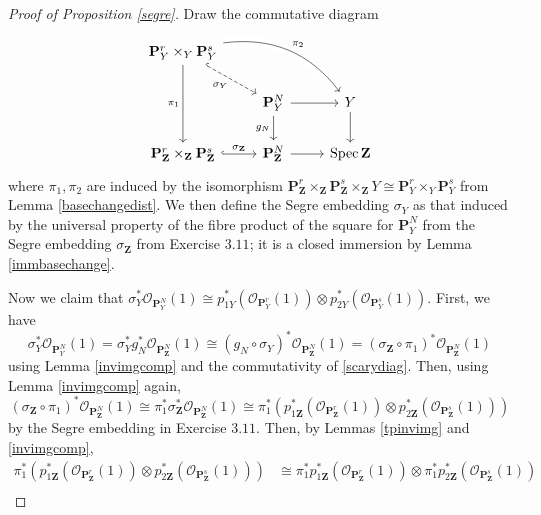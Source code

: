 \documentclass[10pt]{article}
\theoremstyle{definition}
\theoremstyle{remark}
\numberwithin{equation}{section}
\numberwithin{figure}{subsubsection}
\DeclareMathOperator{\Spec}{Spec}
\newcommand{\OO}{\mathcal{O}}
\begin{document}
\begin{proof}[Proof of Proposition \ref{segre}]
  Draw the commutative diagram
  \begin{equation}\label{scarydiag}
    \begin{tikzcd}
      \mathbf{P}_Y^r \times_Y \mathbf{P}_Y^s\arrow{dd}[swap]{\pi_1}\arrow[dashed,hook]{dr}[swap]{\sigma_Y}\arrow[bend left,crossing over]{drr}{\pi_2}\\
      & \mathbf{P}_Y^N\dar[swap]{g_N} \rar & Y\dar\\
      \mathbf{P}_{\mathbf{Z}}^r \times_{\mathbf{Z}} \mathbf{P}_{\mathbf{Z}}^s \rar[hook]{\sigma_{\mathbf{Z}}} & \mathbf{P}_{\mathbf{Z}}^N \rar & \Spec \mathbf{Z}
    \end{tikzcd}
  \end{equation}
  where $\pi_1,\pi_2$ are induced by the isomorphism $\mathbf{P}^r_{\mathbf{Z}}
  \times_{\mathbf{Z}} \mathbf{P}^s_{\mathbf{Z}} \times_{\mathbf{Z}} Y \cong
  \mathbf{P}^r_Y \times_Y \mathbf{P}^s_Y$ from Lemma \ref{basechangedist}. We
  then define the Segre embedding $\sigma_Y$ as that induced by the universal
  property of the fibre product of the square for $\mathbf{P}_Y^N$ from the
  Segre embedding $\sigma_{\mathbf{Z}}$ from Exercise $3.11$; it is a closed immersion by Lemma \ref{immbasechange}.
  \par Now we claim that $\sigma_Y^*\OO_{\mathbf{P}_Y^N}(1) \cong p_{1Y}^*(\OO_{\mathbf{P}_Y^r}(1)) \otimes p_{2Y}^*(\OO_{\mathbf{P}_Y^s}(1))$. First, we have
  \begin{equation*}
    \sigma_Y^*\OO_{\mathbf{P}_Y^N}(1) = \sigma_Y^*g_N^*\OO_{\mathbf{P}_{\mathbf{Z}}^N}(1) \cong (g_N \circ \sigma_Y)^*\OO_{\mathbf{P}_{\mathbf{Z}}^N}(1) = (\sigma_{\mathbf{Z}} \circ \pi_1)^*\OO_{\mathbf{P}_{\mathbf{Z}}^N}(1)
  \end{equation*}
  using Lemma \ref{invimgcomp} and the commutativity of \eqref{scarydiag}. Then, using Lemma \ref{invimgcomp} again,
  \begin{equation*}
    (\sigma_{\mathbf{Z}} \circ \pi_1)^*\OO_{\mathbf{P}_{\mathbf{Z}}^N}(1) \cong \pi_1^*\sigma_{\mathbf{Z}}^*\OO_{\mathbf{P}_{\mathbf{Z}}^N}(1) \cong \pi_1^*(p_{1\mathbf{Z}}^*(\OO_{\mathbf{P}_\mathbf{Z}^r}(1)) \otimes p_{2\mathbf{Z}}^*(\OO_{\mathbf{P}_\mathbf{Z}^s}(1)))
  \end{equation*}
  by the Segre embedding in Exercise $3.11$. Then, by Lemmas \ref{tpinvimg} and \ref{invimgcomp},
  \begin{align*}
    \pi_1^*(p_{1\mathbf{Z}}^*(\OO_{\mathbf{P}_\mathbf{Z}^r}(1)) \otimes p_{2\mathbf{Z}}^*(\OO_{\mathbf{P}_\mathbf{Z}^s}(1))) &\cong \pi_1^*p_{1\mathbf{Z}}^*(\OO_{\mathbf{P}_\mathbf{Z}^r}(1)) \otimes \pi_1^*p_{2\mathbf{Z}}^*(\OO_{\mathbf{P}_\mathbf{Z}^s}(1))\\

\end{align*}
\end{proof}
\end{document}
